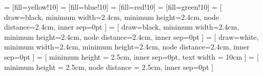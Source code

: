  = [fill=yellow!10]
 = [fill=blue!10]
 = [fill=red!10]
 = [fill=green!10]
 =  [
  draw=black,
  minimum width=2.4cm,
  minimum height=2.4cm,
  node distance=2.4cm,
  inner sep=0pt
]
 = [
  draw=black,
  minimum width=2.4cm,
  minimum height=2.4cm,
  node distance=2.4cm,
  inner sep=0pt
]
 = [
  draw=white,
  minimum width=2.4cm,
  minimum height=2.4cm,
  node distance=2.4cm, inner sep=0pt
]
 = [
  minimum height = 2.5cm, inner sep=0pt, text width = 10cm
]
 = [
  minimum height = 2.5cm, node distance = 2.5cm, inner sep=0pt
]

